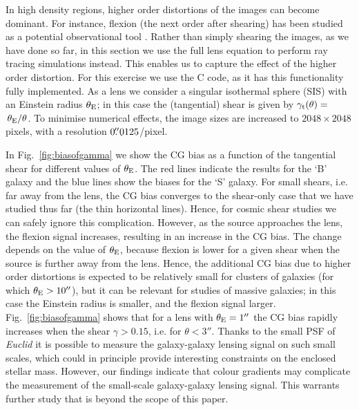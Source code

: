 \documentclass[useAMS,usenatbib]{mnras}
\begin{document}
%
In high density regions, higher order distortions of the images can
become dominant. For instance, flexion (the next order after shearing)
has been studied as a potential observational tool
\citep[e.g.][]{2002ApJ...564...65G,bacon2006,2011MNRAS.412.2665V}. Rather
than simply shearing the images, as we have done so far, in this
section we use the full lens equation to perform ray tracing
simulations instead. This enables us to capture the effect of the
higher order distortion. For this exercise we use the {\sc C} code, as
it has this functionality fully implemented. As a lens we consider a
singular isothermal sphere (SIS) with an Einstein radius $\theta_{\rm
  E}$; in this case the (tangential) shear is given by $\gamma_{\rm
  t}(\theta)=\;$\textonehalf$\,\theta_{\rm E}/\theta$. To minimise numerical
effects, the image sizes are increased to $2048\times2048$ pixels,
with a resolution $0\hbox{$.\!\!^{\prime\prime}$}0125$/pixel.

In Fig.~\ref{fig:biasofgamma} we show the CG bias as a function of the tangential shear
for different values of $\theta_{\rm E}$. The red lines indicate the results for the `B' galaxy
and the blue lines show the biases for the `S' galaxy. For small shears, i.e. far away from the lens,
the CG bias converges to the shear-only case that we have studied thus far (the thin horizontal lines).
Hence, for cosmic shear studies we can safely ignore this complication. However, as the source approaches the lens, the flexion signal increases, resulting in an increase in the  CG bias. The change depends on the value of $\theta_{\rm E}$, because flexion is lower for a given shear when the source is further away from the lens. Hence, the additional CG bias due to higher order distortions is expected to be relatively small for clusters of galaxies (for which $\theta_{\rm E}>10''$), but it can be relevant for studies
of massive galaxies; in this case the Einstein radius is smaller, and the flexion signal larger. Fig.~\ref{fig:biasofgamma} shows that for a lens with $\theta_{\rm E}=1''$ the CG bias rapidly increases when the shear $\gamma>0.15$, i.e. for $\theta<3''$. Thanks to the small PSF of {\it Euclid} it is possible to measure the galaxy-galaxy lensing signal on such small scales, which could in principle provide interesting constraints on the enclosed stellar mass. However, our findings indicate that colour gradients may complicate the measurement of the small-scale galaxy-galaxy lensing signal. This warrants further study that is beyond the scope of this paper.
\end{document}
